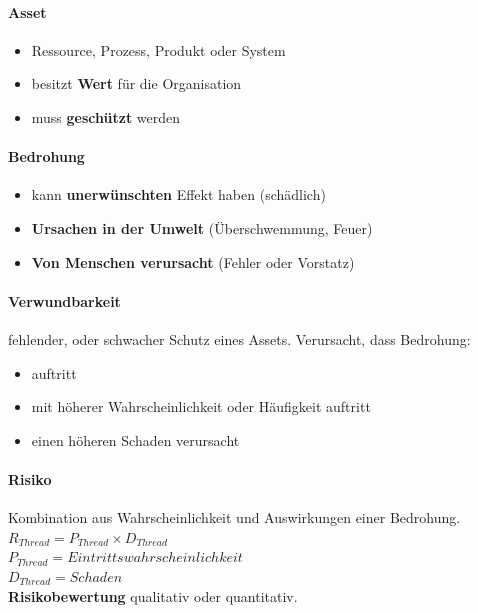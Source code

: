 \paragraph{Asset}
\begin{itemize}
	\item Ressource, Prozess, Produkt oder System
	\item besitzt \textbf{Wert} für die Organisation
	\item muss \textbf{geschützt} werden
\end{itemize}

\paragraph{Bedrohung}
\begin{itemize}
	\item kann \textbf{unerwünschten} Effekt haben (schädlich)
	\item \textbf{Ursachen in der Umwelt} (Überschwemmung, Feuer)
	\item \textbf{Von Menschen verursacht} (Fehler oder Vorstatz)
\end{itemize}

\paragraph{Verwundbarkeit}
fehlender, oder schwacher Schutz eines Assets. Verursacht, dass Bedrohung:
\begin{itemize}
	\item auftritt
	\item mit höherer Wahrscheinlichkeit oder Häufigkeit auftritt
	\item einen höheren Schaden verursacht
\end{itemize}

\paragraph{Risiko} Kombination aus Wahrscheinlichkeit und Auswirkungen einer Bedrohung.\\
$R_{Thread} = P_{Thread} \times D_{Thread}$\\
$P_{Thread} = Eintrittswahrscheinlichkeit$\\
$D_{Thread} = Schaden$\\
\textbf{Risikobewertung} qualitativ oder quantitativ.

